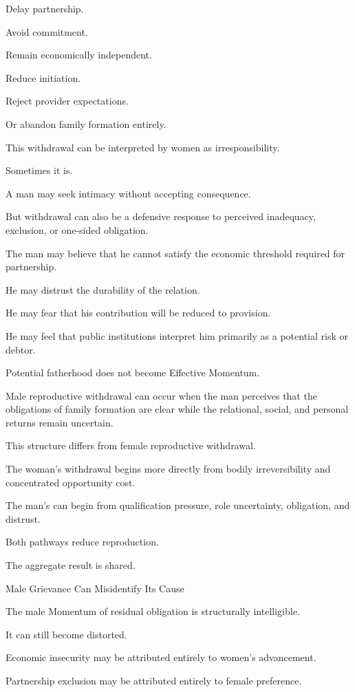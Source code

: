 Delay partnership.

Avoid commitment.

Remain economically independent.

Reduce initiation.

Reject provider expectations.

Or abandon family formation entirely.

This withdrawal can be interpreted by women as irresponsibility.

Sometimes it is.

A man may seek intimacy without accepting consequence.

But withdrawal can also be a defensive response to perceived inadequacy, exclusion, or one-sided obligation.

The man may believe that he cannot satisfy the economic threshold required for partnership.

He may distrust the durability of the relation.

He may fear that his contribution will be reduced to provision.

He may feel that public institutions interpret him primarily as a potential risk or debtor.

Potential fatherhood does not become Effective Momentum.

Male reproductive withdrawal can occur when the man perceives that the obligations of family formation are clear while the relational, social, and personal returns remain uncertain.

This structure differs from female reproductive withdrawal.

The woman’s withdrawal begins more directly from bodily irreversibility and concentrated opportunity cost.

The man’s can begin from qualification pressure, role uncertainty, obligation, and distrust.

Both pathways reduce reproduction.

The aggregate result is shared.

Male Grievance Can Misidentify Its Cause

The male Momentum of residual obligation is structurally intelligible.

It can still become distorted.

Economic insecurity may be attributed entirely to women’s advancement.

Partnership exclusion may be attributed entirely to female preference.

